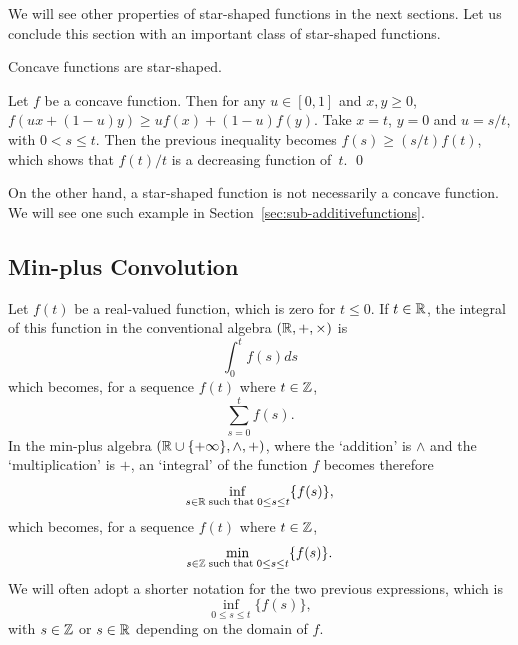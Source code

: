 We will see other properties of star-shaped functions in the next sections.
Let us conclude this section with an important class of star-shaped functions.
\begin{theorem}
Concave functions are star-shaped.
\end{theorem}
\pr Let $f$ be a concave function. Then for any $u \in [0,1]$
and $x, y \geq 0$, $f(ux + (1-u)y) \geq uf(x) + (1-u)f(y)$.
Take $x = t$, $y = 0$ and $u = s/t$, with $0 < s \leq t$. Then the previous inequality becomes
$f(s) \geq (s/t)f(t) $, which shows that $f(t)/t$ is a decreasing function of~$t$.
\qed

On the other hand, a star-shaped function is not necessarily a concave function. We will see one
such example in Section~\ref{sec:sub-additivefunctions}.

\subsection{Min-plus Convolution}
Let $f(t)$ be a real-valued function, which is zero for $t \leq 0$.
If $t \in \mathbb{R}$, the integral of this function in the conventional algebra $(\mathbb{R}, +, \times)$
is $$ \int_{0}^{t} f(s) ds  $$
which becomes, for a sequence $f(t)$ where $t \in \mathbb{Z}$,
$$ \sum_{s=0}^{t} f(s).  $$
In the min-plus algebra $(\mathbb{R} \cup  \{ +\infty \}, \wedge, +)$, where
the `addition' is $\wedge$ and the `multiplication' is $+$,
 an `integral' of the function $f$ becomes therefore
$$ \inf_{s \in \mathbb{R} \mathrm{\; such \; that \; } 0 \leq s \leq t} \{ f(s) \}, $$
which becomes, for a sequence $f(t)$ where $t \in \mathbb{Z}$,
$$ \min_{s \in \mathbb{Z} \mathrm{\; such \; that \; } 0 \leq s \leq t} \{ f(s) \}. $$
We will often adopt a shorter notation for the two previous expressions, which is
$$ \inf_{0 \leq s \leq t} \{ f(s) \}, $$
with $s \in \mathbb{Z}$ or $s \in \mathbb{R}$ depending on the domain of $f$.

